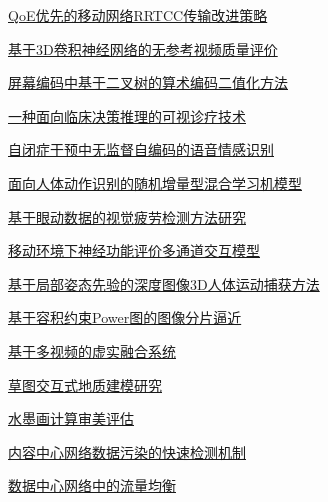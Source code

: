 \documentclass[a4paper]{article}
\begin{document}
\href{http://www.jos.org.cn/ch/reader/create_pdf.aspx?file_no=16024&year_id=2016&quarter_id=S2&falg=1}{QoE优先的移动网络RRTCC传输改进策略}

\href{http://www.jos.org.cn/ch/reader/create_pdf.aspx?file_no=16025&year_id=2016&quarter_id=S2&falg=1}{基于3D卷积神经网络的无参考视频质量评价}

\href{http://www.jos.org.cn/ch/reader/create_pdf.aspx?file_no=16026&year_id=2016&quarter_id=S2&falg=1}{屏幕编码中基于二叉树的算术编码二值化方法}

\href{http://www.jos.org.cn/ch/reader/create_pdf.aspx?file_no=16027&year_id=2016&quarter_id=S2&falg=1}{一种面向临床决策推理的可视诊疗技术}

\href{http://www.jos.org.cn/ch/reader/create_pdf.aspx?file_no=16028&year_id=2016&quarter_id=S2&falg=1}{自闭症干预中无监督自编码的语音情感识别}

\href{http://www.jos.org.cn/ch/reader/create_pdf.aspx?file_no=16029&year_id=2016&quarter_id=S2&falg=1}{面向人体动作识别的随机增量型混合学习机模型}

\href{http://www.jos.org.cn/ch/reader/create_pdf.aspx?file_no=16030&year_id=2016&quarter_id=S2&falg=1}{基于眼动数据的视觉疲劳检测方法研究}

\href{http://www.jos.org.cn/ch/reader/create_pdf.aspx?file_no=16031&year_id=2016&quarter_id=S2&falg=1}{移动环境下神经功能评价多通道交互模型}

\href{http://www.jos.org.cn/ch/reader/create_pdf.aspx?file_no=16032&year_id=2016&quarter_id=S2&falg=1}{基于局部姿态先验的深度图像3D人体运动捕获方法}

\href{http://www.jos.org.cn/ch/reader/create_pdf.aspx?file_no=16033&year_id=2016&quarter_id=S2&falg=1}{基于容积约束Power图的图像分片逼近}

\href{http://www.jos.org.cn/ch/reader/create_pdf.aspx?file_no=16034&year_id=2016&quarter_id=S2&falg=1}{基于多视频的虚实融合系统}

\href{http://www.jos.org.cn/ch/reader/create_pdf.aspx?file_no=16035&year_id=2016&quarter_id=S2&falg=1}{草图交互式地质建模研究}

\href{http://www.jos.org.cn/ch/reader/create_pdf.aspx?file_no=16036&year_id=2016&quarter_id=S2&falg=1}{水墨画计算审美评估}

\href{http://www.jos.org.cn/ch/reader/create_pdf.aspx?file_no=16037&year_id=2016&quarter_id=S2&falg=1}{内容中心网络数据污染的快速检测机制}

\href{http://www.jos.org.cn/ch/reader/create_pdf.aspx?file_no=16038&year_id=2016&quarter_id=S2&falg=1}{数据中心网络中的流量均衡}
\end{document}
